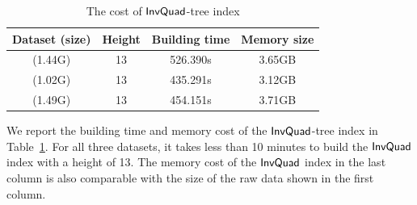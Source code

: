


\begin{table}
	\centering
	\small
	\caption{The cost of $\mathsf{InvQuad}$-tree index}
	\begin{tabular}{|c|c|c|c|} \hline
		Dataset (size) & Height & Building time & Memory size \\ \hline
		\pt{} (1.44G)	& 13 & 526.390s & 3.65GB  \\ \hline
		\sz{} (1.02G)	& 13 & 435.291s  & 3.12GB \\ \hline
		\cd{} (1.49G)	& 13 & 454.151s & 3.71GB \\ \hline
	\end{tabular}	\label{tab:index cost}
	\trim %
\end{table}

We report the building time and memory cost of the $\mathsf{InvQuad}$-tree index in Table~\ref{tab:index cost}.
For all three datasets, it takes less than 10 minutes to build the $\mathsf{InvQuad}$ index with a height of 13.
The memory cost of the $\mathsf{InvQuad}$ index in the last column is also comparable with the size of the raw data shown in the first column.






